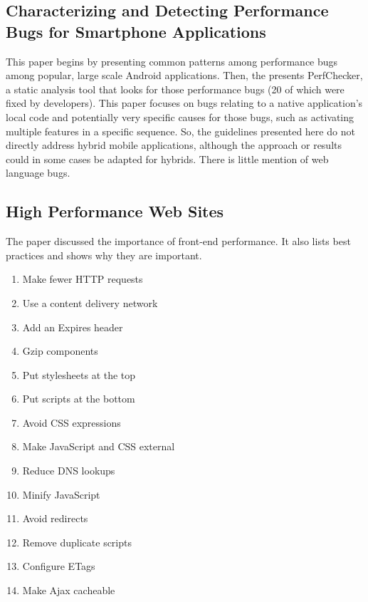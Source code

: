 \documentclass{acm_proc_article-sp}
\begin{document}
\subsection{Characterizing and Detecting Performance Bugs for Smartphone Applications\cite{liu2014characterizing} }
This paper begins by presenting common patterns among performance bugs among popular, large scale Android applications.
Then, the presents PerfChecker, a static analysis tool that looks for those performance bugs (20 of which were fixed by developers).
This paper focuses on bugs relating to a native application’s local code and potentially very specific causes for those bugs, such as activating multiple features in a specific sequence.
So, the guidelines presented here do not directly address hybrid mobile applications, although the approach or results could in some cases be adapted for hybrids.
There is little mention of web language bugs.

\subsection{High Performance Web Sites\cite{souders2008high}}
The paper discussed the importance of front-end performance.
It also lists best practices and shows why they are important.


\begin{enumerate}
	\item Make fewer HTTP requests
	\item Use a content delivery network
	\item Add an Expires header
	\item Gzip components
	\item Put stylesheets at the top
	\item Put scripts at the bottom
	\item Avoid CSS expressions
	\item Make JavaScript and CSS external
	\item Reduce DNS lookups
	\item Minify JavaScript
	\item Avoid redirects
	\item Remove duplicate scripts
	\item Configure ETags
	\item Make Ajax cacheable
\end{enumerate}




\end{document}
